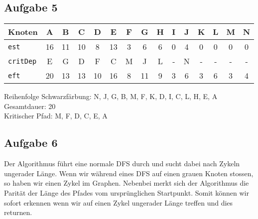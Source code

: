\documentclass[a4paper,graphics,11pt]{article}
\newcommand{\aufgabe}[1]{\subsection*{Aufgabe #1}}
\begin{document}
\aufgabe{5}

\begin{center}
\begin{tabular}{l|*{13}{c|}c}
    Knoten & A & B & C & D & E & F & G & H & I & J & K & L & M & N\\
    \hline
    \texttt{est}    & 16 & 11 & 10 & 8 & 13 & 3 & 6 & 6 & 0 & 4 & 0 & 0 & 0 & 0\\
    \hline
    \texttt{critDep}& E & G & D & F & C & M & J & L & - & N & - & - & - & -\\
    \hline
    \texttt{eft}    & 20 & 13 & 13 & 10 & 16 & 8 & 11 & 9 & 3 & 6 & 3 & 6 & 3 & 4\\
\end{tabular}
\end{center}
Reihenfolge Schwarzfärbung: N, J, G, B, M, F, K, D, I, C, L, H, E, A\\
Gesamtdauer: 20\\
Kritischer Pfad: M, F, D, C, E, A

\newpage

\aufgabe{6}



Der Algorithmus führt eine normale DFS durch und sucht dabei nach Zykeln ungerader Länge.
Wenn wir während eines DFS auf einen grauen Knoten stossen, so haben wir einen Zykel im Graphen.
Nebenbei merkt sich der Algorithmus die Parität der Länge des Pfades vom ursprünglichen Startpunkt.
Somit können wir sofort erkennen wenn wir auf einen Zykel ungerader Länge treffen und dies returnen.
\end{document}

